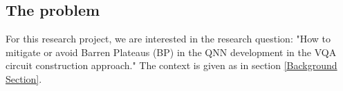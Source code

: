 \subsection{The problem} 
\label{Problem Section}
For this research project, we are interested in the research question: "How to mitigate or avoid Barren Plateaus (BP) in the QNN development in the VQA circuit construction approach." The context is given as in section \ref{Background Section}.